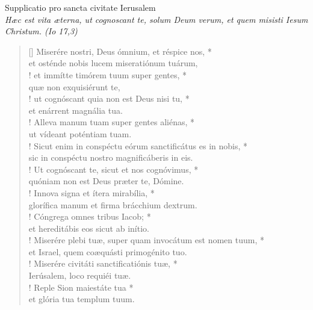 


\def\greinitialformat#1{%
{\fontsize{39}{39}\selectfont #1}%
}




\vspace{0.3cm}
\begin{center}

Supplicatio pro sancta civitate Ierusalem\\
\textit{\small Hæc est vita æterna, ut cognoscant te, solum Deum verum, et quem misisti Iesum Christum. (Io 17,3)}
\end{center}
\begin{verse}[\versewidth]
Miserére nostri, Deus ómnium, et réspice nos, *\\
et osténde nobis lucem miseratiónum tuárum,\\!
\vin et immítte timórem tuum super gentes, *\\
\vin quæ non exquisiérunt te,\\!
ut cognóscant quia non est Deus nisi tu, *\\
et enárrent magnália tua.\\!
\vin Alleva manum tuam super gentes aliénas, *\\
\vin ut vídeant poténtiam tuam.\\!
Sicut enim in conspéctu eórum sanctificátus es in nobis, *\\
sic in conspéctu nostro magnificáberis in eis.\\!
\vin Ut cognóscant te, sicut et nos cognóvimus, *\\
\vin quóniam non est Deus præter te, Dómine.\\!
Innova signa et ítera mirabília, *\\
glorífica manum et firma brácchium dextrum.\\!
\vin Cóngrega omnes tribus Iacob; *\\
\vin et hereditábis eos sicut ab inítio.\\!
Miserére plebi tuæ, super quam invocátum est nomen tuum, *\\
et Israel, quem coæquásti primogénito tuo.\\!
\vin Miserére civitáti sanctificatiónis tuæ, *\\
\vin Ierúsalem, loco requiéi tuæ.\\!
Reple Sion maiestáte tua *\\
et glória tua templum tuum.\\
\end{verse}
\vspace{1cm}


